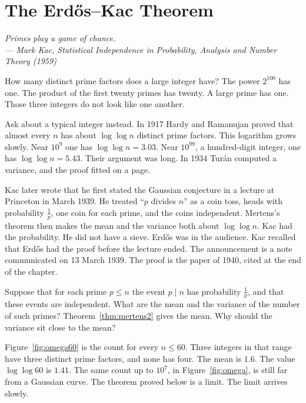 \chapter{The Erd\H{o}s--Kac Theorem}\label{ch:erdoskac}

\begin{center}\itshape
Primes play a game of chance.\\
\upshape --- Mark Kac, \emph{Statistical Independence in Probability, Analysis and Number Theory} (1959)
\end{center}

How many distinct prime factors does a large integer have? The power $2^{100}$ has one. The product of the first twenty primes has twenty. A large prime has one. Those three integers do not look like one another.

Ask about a typical integer instead. In 1917 Hardy and Ramanujan proved that almost every $n$ has about $\log\log n$ distinct prime factors. This logarithm grows slowly. Near $10^{9}$ one has $\log\log n=3.03$. Near $10^{99}$, a hundred-digit integer, one has $\log\log n=5.43$. Their argument was long. In 1934 Turán computed a variance, and the proof fitted on a page.

Kac later wrote that he first stated the Gaussian conjecture in a lecture at Princeton in March 1939. He treated ``$p$ divides $n$'' as a coin toss, heads with probability $\frac1p$, one coin for each prime, and the coins independent. Mertens's theorem then makes the mean and the variance both about $\log\log n$. Kac had the probability. He did not have a sieve. Erd\H{o}s was in the audience. Kac recalled that Erd\H{o}s had the proof before the lecture ended. The announcement is a note communicated on 13 March 1939. The proof is the paper of 1940, cited at the end of the chapter.


\begin{think}
Suppose that for each prime $p\le n$ the event $p\mid n$ has probability $\frac1p$, and that these events are independent. What are the mean and the variance of the number of such primes? Theorem~\ref{thm:mertens2} gives the mean. Why should the variance sit close to the mean?
\end{think}

Figure~\ref{fig:omega60} is the count for every $n\le 60$. Three integers in that range have three distinct prime factors, and none has four. The mean is $1.6$. The value $\log\log 60$ is $1.41$. The same count up to $10^{7}$, in Figure~\ref{fig:omega}, is still far from a Gaussian curve. The theorem proved below is a limit. The limit arrives slowly.


